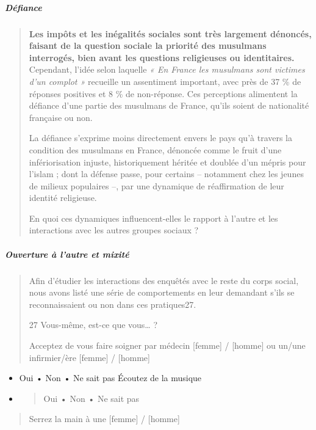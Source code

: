\hypertarget{duxe9fiance}{%
\subparagraph{Défiance}\label{duxe9fiance}}

\begin{quote}
\textbf{Les impôts et les inégalités sociales sont très largement
dénoncés, faisant de la question sociale la priorité des musulmans
interrogés, bien avant les questions religieuses ou identitaires.}
Cependant, l'idée selon laquelle \emph{« En France les musulmans sont
victimes d'un complot »} recueille un assentiment important, avec près
de 37 \% de réponses positives et 8 \% de non-réponse. Ces perceptions
alimentent la défiance d'une partie des musulmans de France, qu'ils
soient de nationalité française ou non.

La défiance s'exprime moins directement envers le pays qu'à travers la
condition des musulmans en France, dénoncée comme le fruit d'une
infériorisation injuste, historiquement héritée et doublée d'un mépris
pour l'islam ; dont la défense passe, pour certains -- notamment chez
les jeunes de milieux populaires --, par une dynamique de réaffirmation
de leur identité religieuse.

En quoi ces dynamiques influencent-elles le rapport à l'autre et les
interactions avec les autres groupes sociaux ?
\end{quote}

\hypertarget{ouverture-uxe0-lautre-et-mixituxe9}{%
\subparagraph{Ouverture à l'autre et
mixité}\label{ouverture-uxe0-lautre-et-mixituxe9}}

\begin{quote}
Afin d'étudier les interactions des enquêtés avec le reste du corps
social, nous avons listé une série de comportements en leur demandant
s'ils se reconnaissaient ou non dans ces pratiques27.

27 Vous-même, est-ce que vous\ldots{} ?

Acceptez de vous faire soigner par médecin {[}femme{]} / {[}homme{]} ou
un/une infirmier/ère {[}femme{]} / {[}homme{]}
\end{quote}

\begin{itemize}
\item
  Oui • Non • Ne sait pas Écoutez de la musique
\item
  \begin{quote}
  Oui • Non • Ne sait pas
  \end{quote}
\end{itemize}

\begin{quote}
Serrez la main à une {[}femme{]} / {[}homme{]}
\end{quote}

